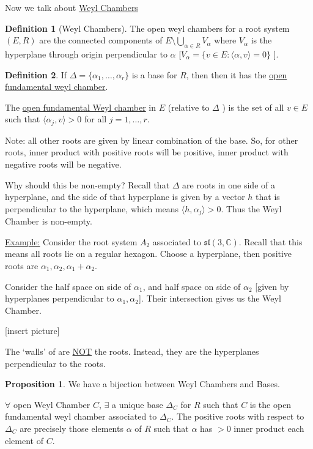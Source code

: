 \documentclass{article}
\theoremstyle{definition}
\newtheorem{definition}{Definition}
\newtheorem{proposition}{Proposition}
\begin{document}
Now we talk about \underline{Weyl Chambers}

\begin{definition}
    [Weyl Chambers]

    The open weyl chambers for a root system \((E,R)\) are the connected components of \(E \setminus \bigcup_{\alpha \in R}^{} V_\alpha\) where \(V_\alpha\) is the hyperplane through origin perpendicular to \(\alpha\) [\(V_\alpha = \{ v\in E : \langle \alpha ,v \rangle = 0 \} \) ].
\end{definition}

\begin{definition}
    If \(\Delta = \{ \alpha_1, \dots , \alpha_r \}\) is a base for \(R\), then then it has the \underline{open fundamental weyl chamber}.

    The \underline{open fundamental Weyl chamber} in \(E\) (relative to \(\Delta\) ) is the set of all \(v\in E\) such that \(\langle \alpha_j, v \rangle > 0\) for all \(j = 1, \dots ,r\).

    Note: all other roots are given by linear combination of the base. So, for other roots, inner product with positive roots will be positive, inner product with negative roots will be negative.

\end{definition}

Why should this be non-empty? Recall that \(\Delta\) are roots in one side of a hyperplane, and the side of that hyperplane is given by a vector \(h\) that is perpendicular to the hyperplane, which means \(\langle h, \alpha_j \rangle > 0\). Thus the Weyl Chamber is non-empty.

\underline{Example:} Consider the root system \(A_2\) associated to \(\mathfrak{sl}(3,\mathbb{C}) \). Recall that this means all roots lie on a regular hexagon. Choose a hyperplane, then positive roots are \(\alpha _1,\alpha _2,\alpha _1+\alpha _2\).

Consider the half space on side of \(\alpha_1\), and half space on side of \(\alpha_2\) [given by hyperplanes perpendicular to \(\alpha_1,\alpha _2\)]. Their intersection gives us the Weyl Chamber.

[insert picture]

The `walls' of are \underline{NOT} the roots. Instead, they are the hyperplanes perpendicular to the roots.

\begin{proposition}
    We have a bijection between Weyl Chambers and Bases.

    \(\forall\) open Weyl Chamber \(C\), \(\exists \) a unique base \(\Delta_C\) for \(R\) such that \(C\) is the open fundamental weyl chamber associated to \(\Delta_C\). The positive roots with respect to \(\Delta_C\) are precisely those elements \(\alpha\) of \(R\) such that \(\alpha\) has \(>0\) inner product each element of \(C\).
\end{proposition}
\end{document}
